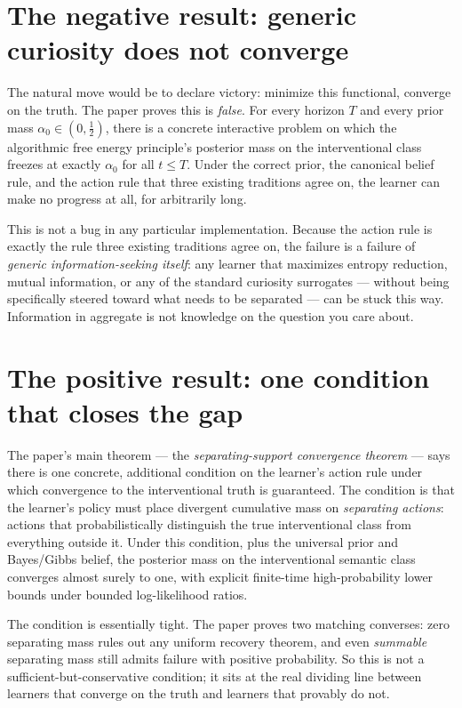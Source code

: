 \documentclass[11pt]{article}
\begin{document}
\section*{The negative result: generic curiosity does not converge}

The natural move would be to declare victory: minimize this functional, converge on the truth. The paper proves this is \emph{false}. For every horizon $T$ and every prior mass $\alpha_0\in(0,\tfrac12)$, there is a concrete interactive problem on which the algorithmic free energy principle's posterior mass on the interventional class freezes at exactly $\alpha_0$ for all $t\le T$. Under the correct prior, the canonical belief rule, and the action rule that three existing traditions agree on, the learner can make no progress at all, for arbitrarily long.

This is not a bug in any particular implementation. Because the action rule is exactly the rule three existing traditions agree on, the failure is a failure of \emph{generic information-seeking itself}: any learner that maximizes entropy reduction, mutual information, or any of the standard curiosity surrogates --- without being specifically steered toward what needs to be separated --- can be stuck this way. Information in aggregate is not knowledge on the question you care about.

\section*{The positive result: one condition that closes the gap}

The paper's main theorem --- the \emph{separating-support convergence theorem} --- says there is one concrete, additional condition on the learner's action rule under which convergence to the interventional truth is guaranteed. The condition is that the learner's policy must place divergent cumulative mass on \emph{separating actions}: actions that probabilistically distinguish the true interventional class from everything outside it. Under this condition, plus the universal prior and Bayes/Gibbs belief, the posterior mass on the interventional semantic class converges almost surely to one, with explicit finite-time high-probability lower bounds under bounded log-likelihood ratios.

The condition is essentially tight. The paper proves two matching converses: zero separating mass rules out any uniform recovery theorem, and even \emph{summable} separating mass still admits failure with positive probability. So this is not a sufficient-but-conservative condition; it sits at the real dividing line between learners that converge on the truth and learners that provably do not.
\end{document}
